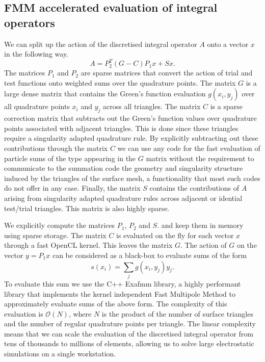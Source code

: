 \subsection{FMM accelerated evaluation of integral operators}
We can split up the action of the discretised integral operator $A$ onto a vector $x$ in the following way.
$$
A = P_2^T (G - C)P_1x + Sx.
$$
The matrices $P_1$ and $P_2$ are sparse matrices that convert the action of trial and test functions onto weighted sums over the quadrature points. The matrix $G$ is a large dense matrix that contains the Green's function evaluation $g(x_i, y_j)$ over all quadrature points $x_i$ and $y_j$ across all triangles. The matrix $C$ is a sparse correction matrix that subtracts out the Green's function values over quadrature points associated with  adjacent triangles. This is done since these triangles require a singularity adapted quadrature rule. By explicitly subtracting out these contributions through the matrix $C$ we can use any code for the fast evaluation of particle sums of the type appearing in the $G$ matrix without the requirement to communicate to the summation code the geometry and singularity structure induced by the triangles of the surface mesh, a functionality that most such codes do not offer in any case. Finally, the matrix $S$ contains the contributions of $A$ arising from singularity adapted quadrature rules across adjacent or idential test/trial triangles. This matrix is also highly sparse.

We explicitly compute the matrices $P_1$, $P_2$ and $S$. and keep them in memory using sparse storage. The matrix $C$ is evaluated on the fly for each vector $x$ through a fast OpenCL kernel. This leaves the matrix $G$. The action of $G$ on the vector $y=P_1x$ can be considered as a black-box to evaluate sums of the form
$$
s(x_i) = \sum_jg(x_i, y_j)y_j.
$$
To evaluate this sum we use the C++ Exafmm library, a highly performant library that implements the kernel independent Fast Multipole Method to approximately evaluate sums of the above form. The complexity of this evaluation is $\mathcal{O}(N)$, where $N$ is the product of the number of surface triangles and the number of regular quadrature points per triangle. The linear complexity means that we can scale the evaluation of the discretised integral operator from tens of thousands to millions of elements, allowing us to solve large  electrostatic simulations on a single workstation.